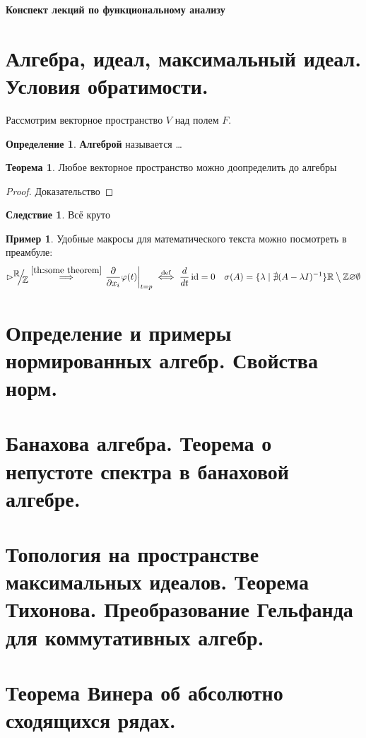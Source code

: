 \documentclass[12pt]{extarticle}
\renewcommand{\setminus}{\mathbin{\big\backslash}}%
\theoremstyle{definition}
\newtheorem{theorem}{\indent Теорема}[section]
\newtheorem{corollary}{\indent Следствие}%
\newtheorem{definition}{\indent Определение}[section]
\newtheorem{example}{\indent Пример}%
\newcommand{\factor}[2]{\raisebox{.35em}{$#1$}\kern-.27em\Big/\kern-.27em\raisebox{-.35em}{$#2$}}
\newcommand{\RR}{\mathbb{R}}
\newcommand{\ZZ}{\mathbb{Z}}
\newcommand{\bb}[1]{\mathbb{#1}}
\newcommand{\implby}[1]{\stackrel{\mathrm{#1}}{\implies}}
\newcommand{\ddt}{\frac{d}{dt}}
\newcommand{\iffdef}{\stackrel{\mathrm{def}}{\iff}}
\newcommand{\at}[2]{\left.#1\right\vert_{#2}}
\newcommand{\partiald}[2]{\frac{\partial #1}{\partial #2}}
\DeclareMathOperator{\id}{id}
\begin{document}
    \begin{titlepage}
        \null
        \vfill
        \centering\Huge\bfseries Конспект лекций по функциональному анализу
        \vfill
        \null
    \end{titlepage}
    \tableofcontents
    \newpage
    \section{Алгебра, идеал, максимальный идеал. Условия обратимости.}
    Рассмотрим векторное пространство $V$ над полем $F$.
    \begin{definition}
        \textbf{Алгеброй} называется \dots
    \end{definition}
    \begin{theorem}\label{th:some theorem}
        Любое векторное пространство можно доопределить до алгебры
    \end{theorem}
    \begin{proof}
        Доказательство
    \end{proof}
    \begin{corollary}
        Всё круто
    \end{corollary}
    \begin{example}
        Удобные макросы для математического текста можно посмотреть в преамбуле:
        $$\rhd
        \factor{\RR}{\bb Z} \implby{\ref{th:some theorem}} \at{\partiald{}{x_i}\varphi(t)}{t=p} \iffdef \ddt\id=0 \quad \sigma(A) = \{\lambda\mid\nexists(A-\lambda I)^{-1}\} \RR\setminus\ZZ \varnothing \emptyset
        $$
    \end{example}
    \section{Определение и примеры нормированных алгебр. Свойства норм.}

    \section{Банахова алгебра. Теорема о непустоте спектра в банаховой алгебре.}

    \section{Топология на пространстве максимальных идеалов. Теорема Тихонова. Преобразование Гельфанда для коммутативных алгебр.}

    \section{Теорема Винера об абсолютно сходящихся рядах.}
\end{document}
